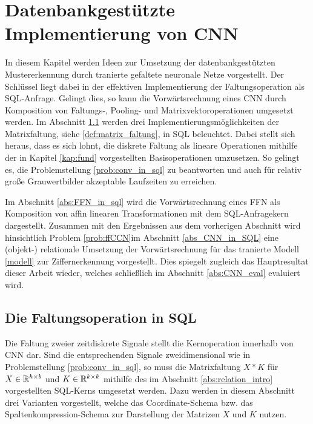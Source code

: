 \chapter{Datenbankgestützte Implementierung von CNN}
\label{kap:CNN_in_SQL}
In diesem Kapitel werden Ideen zur Umsetzung der datenbankgestützten Mustererkennung durch tranierte gefaltete neuronale Netze vorgestellt. Der Schlüssel liegt dabei in der effektiven Implementierung der Faltungsoperation als SQL-Anfrage. Gelingt dies, so kann die Vorwärtsrechnung eines CNN durch Komposition von Faltungs-, Pooling- und Matrixvektoroperationen umgesetzt werden. Im Abschnitt \ref{abs:conv_in_sql} werden drei Implementierungsmöglichkeiten der Matrixfaltung, siehe \ref{def:matrix_faltung}, in SQL beleuchtet. Dabei stellt sich heraus, dass es sich lohnt, die diskrete Faltung als lineare Operationen mithilfe der in Kapitel \ref{kap:fund} vorgestellten Basisoperationen umzusetzen. So gelingt es, die Problemstellung \ref{prob:conv_in_sql} zu beantworten und auch für relativ große Grauwertbilder akzeptable Laufzeiten zu erreichen. 

Im Abschnitt \ref{abs:FFN_in_sql} wird die Vorwärtsrechnung eines FFN als Komposition von affin linearen Transformationen mit dem SQL-Anfragekern dargestellt. Zusammen mit den Ergebnissen aus dem vorherigen Abschnitt wird hinsichtlich Problem \ref{prob:ffCCN}im Abschnitt \ref{abs_CNN_in_SQL} eine (objekt-) relationale Umsetzung der Vorwärtsrechnung für das tranierte Modell \ref{modell} zur Ziffernerkennung vorgestellt. Dies spiegelt zugleich das Hauptresultat dieser Arbeit wieder, welches schließlich im Abschnitt \ref{abs:CNN_eval} evaluiert wird. 
\section{Die Faltungsoperation in SQL}
\label{abs:conv_in_sql}
Die Faltung zweier zeitdiskrete Signale stellt die Kernoperation innerhalb von CNN dar. Sind die entsprechenden Signale zweidimensional wie in Problemstellung \ref{prob:conv_in_sql}, so muss die Matrixfaltung $X \ast K$ für $X \in \mathbb{R}^{h \times b}$ und $K \in \mathbb{R}^{k \times k}$ mithilfe des im Abschnitt \ref{abs:relation_intro} vorgestellten SQL-Kerns umgesetzt werden. Dazu werden in diesem Abschnitt drei Varianten vorgestellt, welche das Coordinate-Schema bzw. das Spaltenkompression-Schema zur Darstellung der Matrizen $X$ und $K$ nutzen. 
